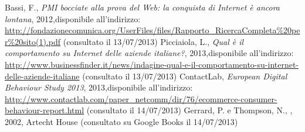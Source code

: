 \begin{thebibliography}{9}
   Bassi, F., \textit{PMI bocciate alla prova del Web: la conquista di Internet è ancora lontana}, 2012,\newline disponibile all'indirizzo: \url{http://fondazionecomunica.org/UserFiles/files/Rapporto_RicercaCompleta%20per%20sito(1).pdf} (consultato il 13/07/2013)
   Picciaiola, L., \textit{Qual è il comportamento su Internet delle aziende italiane?}, 2013,\newline disponibile all'indirizzo: \url{http://www.businessfinder.it/news/indagine-qual-e-il-comportamento-su-internet-delle-aziende-italiane} (consultato il 13/07/2013)
   ContactLab, \textit{European Digital Behaviour Study 2013}, 2013,\newline disponibile all'indirizzo: \url{http://www.contactlab.com/paper_netcomm/dir/76/ecommerce-consumer-behaviour-report.html} (consultato il 14/07/2013)
   Gerrard, P. e Thompson, N., , 2002, Artecht House (consultato su Google Books il 14/07/2013)
\end{thebibliography}


